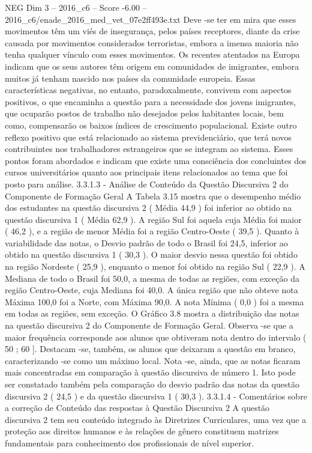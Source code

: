 \begin{textsample}{NEG Dim 3 – 2016\_c6 – Score -6.00 – 2016\_c6/enade\_2016\_med\_vet\_07e2ff493e.txt}
Deve -se ter em mira que esses movimentos têm um viés de insegurança, pelos países receptores, diante da crise causada por movimentos considerados terroristas, embora a imensa maioria não tenha qualquer vínculo com esses movimentos.
Os recentes atentados na Europa indicam que os seus autores têm origem em comunidades de imigrantes, embora muitos já tenham nascido nos países da comunidade europeia.
Essas características negativas, no entanto, paradoxalmente, convivem com aspectos positivos, o que encaminha a questão para a necessidade dos jovens imigrantes, que ocuparão postos de trabalho não desejados pelos habitantes locais, bem como, compensarão os baixos índices de crescimento populacional.
Existe outro reflexo positivo que está relacionado ao sistema previdenciário, que terá novos contribuintes nos trabalhadores estrangeiros que se integram ao sistema.
Esses pontos foram abordados e indicam que existe uma consciência dos concluintes dos cursos universitários quanto aos principais itens relacionados ao tema que foi posto para análise. 3.3.1.3 - Análise de Conteúdo da Questão Discursiva 2 do Componente de Formação Geral A Tabela 3.15 mostra que o desempenho médio dos estudantes na questão discursiva 2 ( Média 44,9 ) foi inferior ao obtido na questão discursiva 1 ( Média 62,9 ).
A região Sul foi aquela cuja Média foi maior ( 46,2 ), e a região de menor Média foi a região Centro-Oeste ( 39,5 ).
Quanto à variabilidade das notas, o Desvio padrão de todo o Brasil foi 24,5, inferior ao obtido na questão discursiva 1 ( 30,3 ).
O maior desvio nessa questão foi obtido na região Nordeste ( 25,9 ), enquanto o menor foi obtido na região Sul ( 22,9 ).
A Mediana de todo o Brasil foi 50,0, a mesma de todas as regiões, com exceção da região Centro-Oeste, cuja Mediana foi 40,0.
A única região que não obteve nota Máxima 100,0 foi a Norte, com Máxima 90,0.
A nota Mínima ( 0,0 ) foi a mesma em todas as regiões, sem exceção.
O Gráfico 3.8 mostra a distribuição das notas na questão discursiva 2 do Componente de Formação Geral.
Observa -se que a maior frequência corresponde aos alunos que obtiveram nota dentro do intervalo ( 50 ; 60 ].
Destacam -se, também, os alunos que deixaram a questão em branco, caracterizando -se como um máximo local.
Nota -se, ainda, que as notas ficaram mais concentradas em comparação à questão discursiva de número 1.
Isto pode ser constatado também pela comparação do desvio padrão das notas da questão discursiva 2 ( 24,5 ) e da questão discursiva 1 ( 30,3 ). 3.3.1.4 - Comentários sobre a correção de Conteúdo das respostas à Questão Discursiva 2 A questão discursiva 2 tem seu conteúdo integrado às Diretrizes Curriculares, uma vez que a proteção aos direitos humanos e às relações de gênero constituem matrizes fundamentais para conhecimento dos profissionais de nível superior.

\end{textsample}
